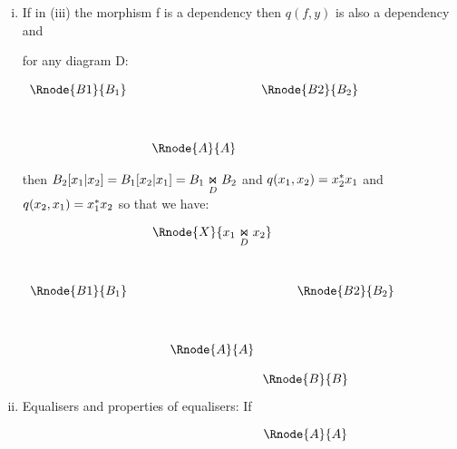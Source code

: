 \documentclass[10pt,a4paper]{scrartcl}
\begin{document}
\begin{enumerate} [(i)]
\noindent


\item If in (iii) the morphism f is a dependency then  $q(f,y)$ is also a dependency and 

\noindent for any diagram D:
\begin{center}
$
\begin{array}{cp{0cm}cp{0cm}c}
\Rnode{B1}{B_1}& &            &  &\Rnode{B2}{B_2} \\ [1.2cm]
               & &\Rnode{A}{A}& &
\end{array}
$
\end{center}

\noindent then
$B_2[x_1|x_2]=B_1[x_2|x_1] = \fibrex{B_1}{B_2}{D}$ and $q(x_1,x_2)= x_2\sub x_1 $ and $q(x_2,x_1)= x_1 \sub x_2$
\noindent
so that we have:

\begin{center}
$
\begin{array}{cp{0cm}cp{0cm}c}
               && \Rnode{X}{\fibrex{x_1}{x_2}{D}}&&                \\ [1.2cm]
\Rnode{B1}{B_1}&&                                && \Rnode{B2}{B_2} \\ [1.2cm]
               &&\Rnode{A}{A}                    && 
\end{array}
$
\end{center}





\iffalse
\item Equalisers and properties of equalisers: If
\setlength{\arraycolsep}{1cm}
$
\begin{array}{c}
\Rnode{B}{B} \\ [1.1cm]
\Rnode{A}{A} \\
\end{array}
$


\end{enumerate}
\end{document}
